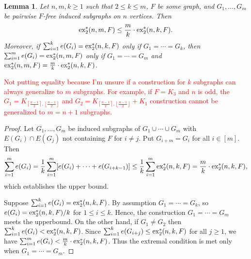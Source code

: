 \documentclass[12pt]{report}
\newtheorem{lemma}[theorem]{Lemma}
\newcommand*{\dex}{\textnormal{ex}_2}
\begin{document}
\begin{lemma}\label{lem:induce-reduce}
  Let $n, m, k \geq 1$ such that $2 \leq k \leq m$, $F$ be some graph, and $G_1, \ldots, G_m$ be pairwise $F$-free induced subgraphs on $n$ vertices. Then
  \[
    \dex^*(n, m, F) \leq \frac{m}{k} \cdot \dex^*(n, k, F).
  \]
  Moreover, if $\sum_{i = 1}^k e(G_i) = \dex^*(n, k, F)$ only if $G_1 = \cdots = G_k$, then $\sum_{i = 1}^m e(G_i) = \dex^*(n, m, F)$ only if $G_1 = \cdots = G_m$ and $\dex^*(n, m, F) = \frac{m}{k} \cdot \dex^*(n, k, F)$.
\end{lemma}

\textcolor{red}{Not putting equality because I'm unsure if a construction for $k$ subgraphs can always generalize to $m$ subgraphs. For example, if $F = K_3$ and $n$ is odd, the $G_1 = K_{\left\lceil\frac{n - 1}{2}\right\rceil, \left\lfloor\frac{n - 1}{2}\right\rfloor}$ and $G_2 = K_{\left\lceil\frac{n - 1}{2}\right\rceil, \left\lfloor\frac{n - 1}{2}\right\rfloor} + K_1$ construction cannot be generalized to $m = n + 1$ subgraphs.}

\begin{proof}
  Let $G_1, \ldots, G_m$ be induced subgraphs of $G_1 \cup \cdots \cup G_m$ with $E(G_i) \cap E(G_j)$ not containing $F$ for $i \neq j$. Put $G_{i + m} = G_i$ for all $i \in [m]$. Then
  \[
    \sum_{i = 1}^m e(G_i) = \frac{1}{k}\sum_{i = 1}^m [e(G_i) + \cdots + e(G_{i + k - 1})] \leq \frac{1}{k}\sum_{i = 1}^m \dex^*(n, k, F) = \frac{m}{k} \cdot \dex^*(n, k, F),
  \]
  which establishes the upper bound.

  Suppose $\sum_{i = 1}^k e(G_i) = \dex^*(n, k, F)$. By assumption $G_1 = \cdots = G_k$, so $e(G_i) = \dex^*(n, k, F)/k$ for $1 \leq i \leq k$. Hence, the construction $G_1 = \cdots = G_m$ meets the upperbound. On the other hand, if $G_1 \neq G_2$ then $\sum_{i = 1}^k e(G_i) < \dex^*(n, k, F)$. Since $\sum_{i = 1}^k e(G_{i + j}) \leq \dex^*(n, k, F)$ for all $j \geq 1$, we have $\sum_{i = 1}^m e(G_i) < \frac{m}{k} \cdot \dex^*(n, k, F)$. Thus the extremal condition is met only when $G_1 = \cdots = G_m$.
\end{proof}
\end{document}
